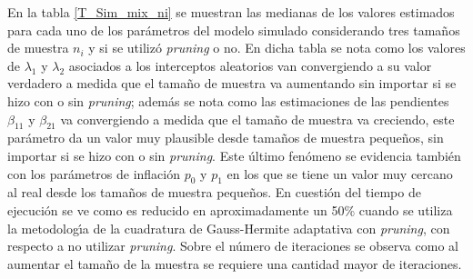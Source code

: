 En la tabla \ref{T_Sim_mix_ni} se muestran las medianas de los valores estimados para cada uno de los par\'{a}metros del modelo simulado considerando tres tama\~{n}os de muestra $n_i$ y si se utiliz\'{o} \textit{pruning} o no. En dicha tabla se nota como los valores de $\lambda_1$ y $\lambda_2$ asociados a los interceptos aleatorios van convergiendo a su valor verdadero a medida que el tama\~{n}o de muestra va aumentando sin importar si se hizo con o sin \textit{pruning}; adem\'{a}s se nota como las estimaciones de las pendientes $\beta_{11}$ y $\beta_{21}$ va convergiendo a medida que el tama\~{n}o de muestra va creciendo, este par\'{a}metro da un valor muy plausible desde tama\~{n}os de muestra peque\~{n}os, sin importar si se hizo con o sin \textit{pruning}. Este \'{u}ltimo fen\'{o}meno se evidencia tambi\'{e}n con los par\'{a}metros de inflaci\'{o}n $p_0$ y $p_1$ en los que se tiene un valor muy cercano al real desde los tama\~{n}os de muestra peque\~{n}os. En cuesti\'{o}n del tiempo de ejecuci\'{o}n se ve como es reducido en aproximadamente un 50\% cuando se utiliza la metodolog\'{\i}a de la cuadratura de Gauss-Hermite adaptativa con \textit{pruning}, con respecto a no utilizar \textit{pruning}. Sobre el n\'{u}mero de iteraciones se observa como al aumentar el tama\~{n}o de la muestra se requiere una cantidad mayor de iteraciones.\\

